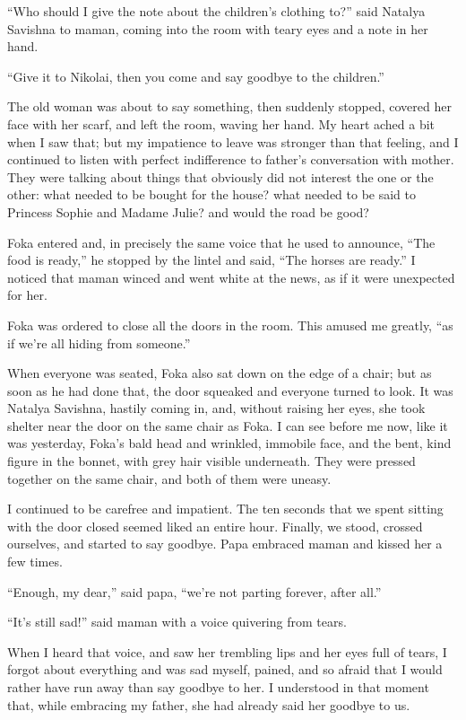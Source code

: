 ``Who should I give the note about the children's clothing to?'' said Natalya Savishna to maman, coming into the room with teary eyes and a note in her hand. %

``Give it to Nikolai, then you come and say goodbye to the children.''

The old woman was about to say something, then suddenly stopped, covered her face with her scarf, and left the room, waving her hand. My heart ached a bit when I saw that; but my impatience to leave was stronger than that feeling, and I continued to listen with perfect indifference to father's conversation with mother. They were talking about things that obviously did not interest the one or the other: what needed to be bought for the house? what needed to be said to Princess Sophie and Madame Julie? and would the road be good?

Foka entered and, in precisely the same voice that he used to announce, ``The food is ready,'' he stopped by the lintel and said, ``The horses are ready.'' I noticed that maman winced and went white at the news, as if it were unexpected for her. %

Foka was ordered to close all the doors in the room. This amused me greatly, ``as if we're all hiding from someone.''

When everyone was seated, Foka also sat down on the edge of a chair; but as soon as he had done that, the door squeaked and everyone turned to look. It was Natalya Savishna, hastily coming in, and, without raising her eyes, she took shelter near the door on the same chair as Foka. I can see before me now, like it was yesterday, Foka's bald head and wrinkled, immobile face, and the bent, kind figure in the bonnet, with grey hair visible underneath. They were pressed together on the same chair, and both of them were uneasy.

I continued to be carefree and impatient. The ten seconds that we spent sitting with the door closed seemed liked an entire hour. Finally, we stood, crossed ourselves, and started to say goodbye. Papa embraced maman and kissed her a few times.

``Enough, my dear,'' said papa, ``we're not parting forever, after all.'' %

``It's still sad!'' said maman with a voice quivering from tears. %

When I heard that voice, and saw her trembling lips and her eyes full of tears, I forgot about everything and was sad myself, pained, and so afraid that I would rather have run away than say goodbye to her. I understood in that moment that, while embracing my father, she had already said her goodbye to us.

